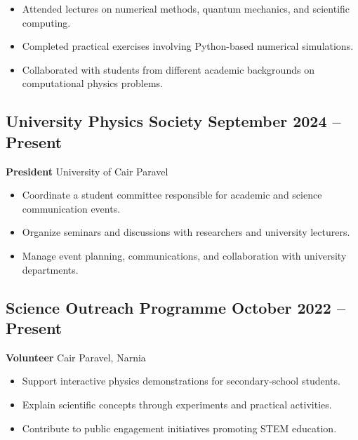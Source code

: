 \documentclass[11pt]{article}
\begin{document}
\begin{itemize}
    \item Attended lectures on numerical methods, quantum mechanics,
    and scientific computing.
    \item Completed practical exercises involving Python-based
    numerical simulations.
    \item Collaborated with students from different academic backgrounds
    on computational physics problems.
\end{itemize}



\CVNewPage


\subsection{
    \texorpdfstring{
    University Physics Society
    \hfill September 2024 -- Present
    }
    {
    University Physics Society
    -- September 2024 -- Present
    }
}

\textbf{President}
\hfill University of Cair Paravel

\begin{itemize}
    \item Coordinate a student committee responsible for academic
    and science communication events.
    \item Organize seminars and discussions with researchers
    and university lecturers.
    \item Manage event planning, communications, and collaboration
    with university departments.
\end{itemize}

\subsection{
    \texorpdfstring{
    Science Outreach Programme
    \hfill October 2022 -- Present
    }
    {Science Outreach Programme
    -- October 2022 -- Present}
}

\textbf{Volunteer}
\hfill Cair Paravel, Narnia

\begin{itemize}
    \item Support interactive physics demonstrations for secondary-school
    students.
    \item Explain scientific concepts through experiments and practical
    activities.
    \item Contribute to public engagement initiatives promoting
    STEM education.
\end{itemize}
\end{document}
